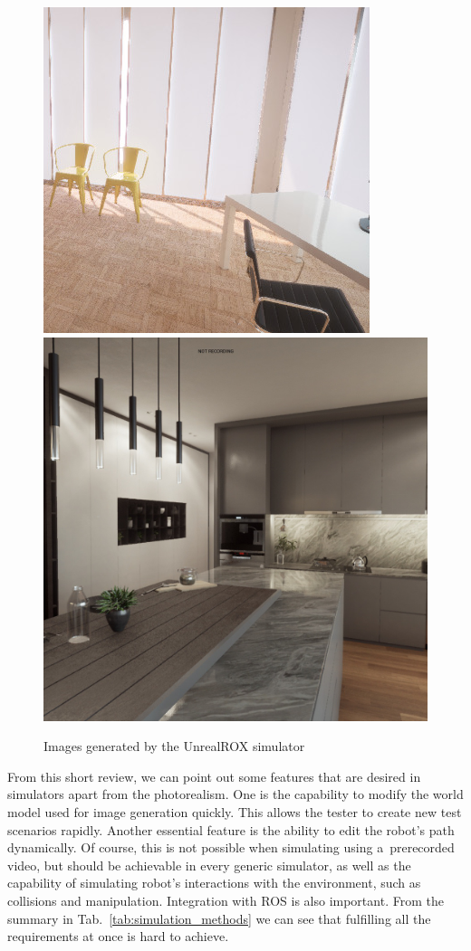 \documentclass[conference]{ieeetran}
\begin{document}
\begin{figure}[!htb]
    \includegraphics[width=0.494\columnwidth]{img/gazebo_vs_real/rox1.png}\hfill%
    \includegraphics[width=0.494\columnwidth]{img/gazebo_vs_real/rox2.jpg}
    \caption{Images generated by the UnrealROX simulator \cite{martinez2019unrealrox}}
    \label{fig:rox_samples}
\end{figure}



From this short review, we can point out some features that are desired in simulators \cite{staranowicz2011survey} 
apart from the photorealism.
One is the capability to modify the world model used for image generation quickly.
This allows the tester to create new test scenarios rapidly.
Another essential feature is the ability to edit the robot's path dynamically.
Of course, this is not possible when simulating using a~prerecorded video, but should be achievable 
in every generic simulator, as well as the capability of simulating robot's interactions with the
environment, such as collisions and manipulation. Integration with ROS is also important. From the summary
in Tab.~\ref{tab:simulation_methods} we can see that fulfilling all the requirements at once is hard to achieve.
\end{document}
